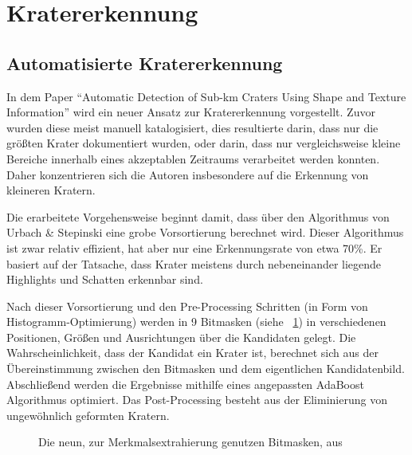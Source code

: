 
\section{Kratererkennung}

\subsection{Automatisierte Kratererkennung}
\label{ssec:bandeira}
In dem Paper \enquote{Automatic Detection of Sub-km Craters Using Shape and Texture Information}\cite{bandeira} wird ein neuer Ansatz zur Kratererkennung vorgestellt. Zuvor wurden diese meist manuell katalogisiert, dies resultierte darin, dass nur die größten Krater dokumentiert wurden, oder darin, dass nur vergleichsweise kleine Bereiche innerhalb eines akzeptablen Zeitraums verarbeitet werden konnten. Daher konzentrieren sich die Autoren insbesondere auf die Erkennung von kleineren Kratern.

Die erarbeitete Vorgehensweise beginnt damit, dass über den Algorithmus von Urbach \& Stepinski\cite{urbach2009automatic} eine grobe Vorsortierung berechnet wird. Dieser Algorithmus ist zwar relativ effizient, hat aber nur eine Erkennungsrate von etwa 70\%. Er basiert auf der Tatsache, dass Krater meistens durch nebeneinander liegende Highlights und Schatten erkennbar sind.

Nach dieser Vorsortierung und den Pre-Processing Schritten (in Form von Histogramm-Optimierung) werden in \cite{bandeira} 9 Bitmasken (siehe \figurename~\ref{fig:BDS12_01}) in verschiedenen Positionen, Größen und Ausrichtungen über die Kandidaten gelegt. Die Wahrscheinlichkeit, dass der Kandidat ein Krater ist, berechnet sich aus der Übereinstimmung zwischen den Bitmasken und dem eigentlichen Kandidatenbild. Abschließend werden die Ergebnisse mithilfe eines angepassten AdaBoost Algorithmus optimiert. Das Post-Processing besteht aus der Eliminierung von ungewöhnlich geformten Kratern.

\begin{figure}[h]
	\caption{Die neun, zur Merkmalsextrahierung genutzen Bitmasken, aus \cite{bandeira}}
	\label{fig:BDS12_01}
\end{figure}

